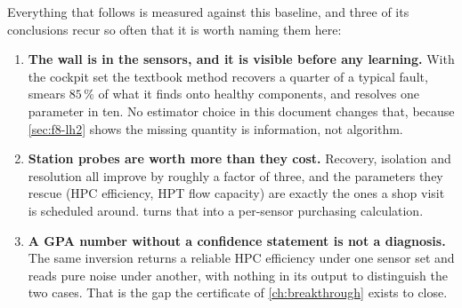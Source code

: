 Everything that follows is measured against this baseline, and three of its conclusions recur
so often that it is worth naming them here:

\begin{enumerate}
  \item \textbf{The wall is in the sensors, and it is visible before any learning.} With the
    cockpit set the textbook method recovers a quarter of a typical fault, smears $85\,\%$ of
    what it finds onto healthy components, and resolves one parameter in ten. No estimator
    choice in this document changes that, because \cref{sec:f8-lh2} shows the missing quantity
    is information, not algorithm.
  \item \textbf{Station probes are worth more than they cost.} Recovery, isolation and
    resolution all improve by roughly a factor of three, and the parameters they rescue
    (HPC efficiency, HPT flow capacity) are exactly the ones a shop visit is scheduled around.
     turns that into a per-sensor purchasing calculation.
  \item \textbf{A GPA number without a confidence statement is not a diagnosis.} The same
    inversion returns a reliable HPC efficiency under one sensor set and reads pure noise under
    another, with nothing in its output to distinguish the two cases. That is the gap the
    certificate of \cref{ch:breakthrough} exists to close.
\end{enumerate}
